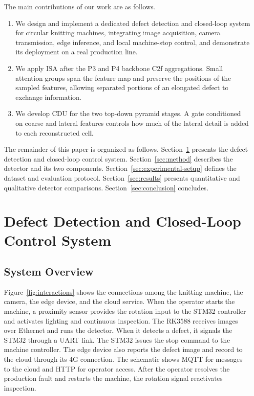 \documentclass[lettersize,journal]{IEEEtran}
\begin{document}
The main contributions of our work are as follows.
\begin{enumerate}
  \renewcommand{\labelenumi}{\arabic{enumi})}
  \item We design and implement a dedicated defect detection and closed-loop system for circular knitting machines, integrating image acquisition, camera transmission, edge inference, and local machine-stop control, and demonstrate its deployment on a real production line.
  \item We apply ISA after the P3 and P4 backbone C2f aggregations. Small attention groups span the feature map and preserve the positions of the sampled features, allowing separated portions of an elongated defect to exchange information.
  \item We develop CDU for the two top-down pyramid stages. A gate conditioned on coarse and lateral features controls how much of the lateral detail is added to each reconstructed cell.
\end{enumerate}

The remainder of this paper is organized as follows. Section~\ref{sec:system-design} presents the defect detection and closed-loop control system. Section~\ref{sec:method} describes the detector and its two components. Section~\ref{sec:experimental-setup} defines the dataset and evaluation protocol. Section~\ref{sec:results} presents quantitative and qualitative detector comparisons. Section~\ref{sec:conclusion} concludes.

\section{Defect Detection and Closed-Loop Control System}
\label{sec:system-design}
\subsection{System Overview}
\label{sec:system-overview}
Figure~\ref{fig:interactions} shows the connections among the knitting machine, the camera, the edge device, and the cloud service. When the operator starts the machine, a proximity sensor provides the rotation input to the STM32 controller and activates lighting and continuous inspection. The RK3588 receives images over Ethernet and runs the detector. When it detects a defect, it signals the STM32 through a UART link. The STM32 issues the stop command to the machine controller. The edge device also reports the defect image and record to the cloud through its 4G connection. The schematic shows MQTT for messages to the cloud and HTTP for operator access. After the operator resolves the production fault and restarts the machine, the rotation signal reactivates inspection.
\end{document}
